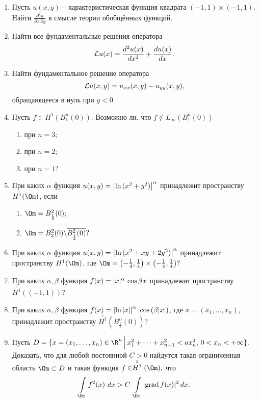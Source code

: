 \documentclass[a4paper]{article}
\def\a{\alpha}
\def\b{\beta}
\def\cL{{\cal L}}
\begin{document}
\begin{enumerate}
\item
Пусть $u(x,y)$ -- характеристическая функция квадрата $(-1,1)\times(-1,1).$
Найти $\frac{\partial^2 u}{\partial x\, \partial y}$ в смысле теории
обобщённых функций.

\item
Найти все фундаментальные решения оператора
$$
\cL u(x)=\frac{d^2 u(x)}{dx^2} +\frac{d u(x)}{dx}.
$$

\item
Найти фундаментальное решение оператора
$$
\cL u(x,y)= u_{xx}(x,y) - u_{yy}(x,y),
$$
обращающееся в нуль при $y<0$.

\item
Пусть $f\in H^1(B_1^n(0))$. Возможно ли, что $f\notin L_\infty (B_1^n(0))$

\begin{enumerate}
\item
при $n=3;$
\item
при $n=2;$
\item
при $n=1?$
\end{enumerate}

\item
При каких $\a$ функция $u(x,y) = \left|\hbox{ln}\, (x^2+y^2)\right|^\a$
принадлежит пространству $H^1(\Om)$, если
\begin{enumerate}
\item
$\Om=B_{\frac{1}{2}}^2(0);$
\item
$\Om=B_2^2(0)\backslash \overline{B^2_{\frac{1}{2}}(0)}?$
\end{enumerate}

\item
При каких $\a$ функция $u(x,y) = \left|\hbox{ln}\, (x^2+xy+2y^2)\right|^\a$
принадлежит пространству $H^1(\Om)$, где
$\Om=\left(-\frac{1}{4},\frac{1}{4}\right)\times
\left(-\frac{1}{4},\frac{1}{4}\right)?$

\item
При каких $\a,\b$ функция $f(x) = |x|^\a\ \hbox{cos}\, \b x$
принадлежит пространству $\stackrel{\circ}{H^1}((-1,1))$?

\item
При каких $\a,\b$ функция $f(x) = \left|\hbox{ln}\,|x|\right|^\a\
\hbox{cos}\,( \b |x|)$, где $x=(x_1,\dots,x_n)$,
принадлежит пространству $\stackrel{\circ}{H^1}(B^n_{\frac{1}{2}}(0))$?

\item
Пусть $D=\{x=(x_1,\dots,x_n)\in \R^n\, \Big|\, x_1^2+\dots+x_{n-1}^2<
ax_n^2,\, 0<x_n<+\infty\}.$ Доказать, что для любой постоянной $C>0$ найдутся
такая ограниченная область $\Om\subset D$ и такая функция $f\in \stackrel
{\circ}{H^1}(\Om),$ что
$$
\int\limits_{\Om} f^2(x)\ dx > C\ \int\limits_{\Om}|\hbox{grad}\, f(x)|^2\,
dx.
$$



\end{enumerate}
\end{document}
